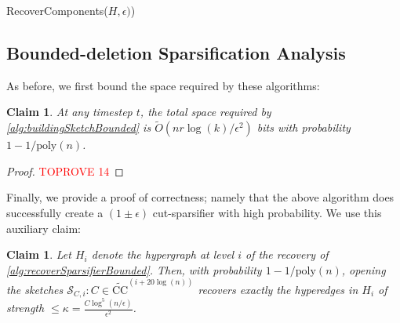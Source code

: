 \documentclass[11pt]{article}
\newtheorem{claim}[theorem]{Claim}
\theoremstyle{definition}
\newcommand{\eps}{\epsilon}
\begin{document}
\begin{algorithm}[H]
	\caption{RecoverComponents($H, \eps)$)}\label{alg:recoverSparsifierBounded}
\end{algorithm}

\subsection{Bounded-deletion Sparsification Analysis}

As before, we first bound the space required by these algorithms:

\begin{claim}\label{clm:sketchSpaceBounded}
	At any timestep $t$, the total space required by \cref{alg:buildingSketchBounded} is $\widetilde{O}(nr\log(k) / \eps^2)$ bits with probability $1 - 1 / \mathrm{poly}(n)$.
\end{claim}

\begin{proof}\textcolor{red}{TOPROVE 14}\end{proof}

Finally, we provide a proof of correctness; namely that the above algorithm does successfully create a $(1 \pm \eps)$ cut-sparsifier with high probability. We use this auxiliary claim:

\begin{claim}\label{clm:recoversLowStrengthBounded}
	Let $H_i$ denote the hypergraph at level $i$ of the recovery of \cref{alg:recoverSparsifierBounded}. Then, with probability $1 - 1 / \mathrm{poly}(n)$, opening the sketches $\mathcal{S}_{C, i}: C \in \widetilde{\mathrm{CC}}^{(i + 20 \log(n))}$ recovers exactly the hyperedges in $H_i$ of strength $\leq \kappa =  \frac{C \log^5(n / \eps)}{ \eps^2}$.
\end{claim}
\end{document}

